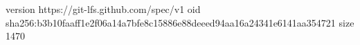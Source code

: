 version https://git-lfs.github.com/spec/v1
oid sha256:b3b10faaff1e2f06a14a7bfe8c15886e88deeed94aa16a24341e6141aa354721
size 1470
